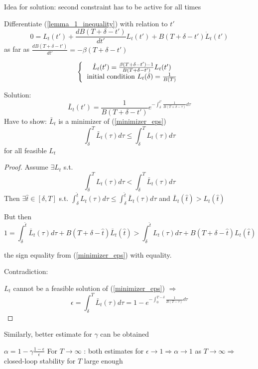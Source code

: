 Idea for solution:
second constraint has to be active for all times 

Differentiate (\ref{lemma_1_inequality}) with relation to $t'$ 
\begin{equation*}
0 = L_t(t') + \frac{dB(T+\delta-t')}{dt'}L_t(t') + B(T + \delta - t') \dot L_t(t')
\end{equation*} 
as far as $\frac{dB(T+\delta-t')}{dt'} = -\beta(T+\delta - t')$

\begin{equation*}
\left \{
  \begin{tabular}{c}
  $\dot L_t(t') = \frac{\beta(T+\delta - t') -1}{B(T+\delta - t')}L_t(t')$ \\
 initial condition $L_t(\delta)=\frac{1}{B(T)}$
  \end{tabular}
\right .
\end{equation*}

Solution:
\begin{equation*}
\bar L_t(t') = \frac{1}{B(T+\delta-t')}e^{-\int_{\delta}^{t'}\frac{1}{B (T+\delta-\tau)}d\tau}
\end{equation*}
Have to show: $\bar L_t$ is a minimizer of (\ref{minimizer_eps})
\begin{equation*}
\int_{\delta}^{T} \bar L_t(\tau)d\tau \leq \int_{\delta}^{T} L_t(\tau)d\tau 
\end{equation*}
for all feasible $L_t$

\begin{proof}

Assume $\exists L_t$ s.t. 
\begin{equation*}
\int_{\delta}^{T}L_t(\tau)d\tau < \int_{\delta}^{T}\bar L_t(\tau)d\tau
\end{equation*}
Then $\exists \hat t \in [\delta, T]$ s.t. $\int_{\delta}^{\hat t}L_t(\tau)d\tau \leq \int_{\delta}^{\hat t}\bar L_t(\tau)d\tau$ and $\bar L_t(\hat t) > L_t(\hat t)$

But then 
\begin{equation}
1 = \int_{\delta}^{\hat t} \bar L_t(\tau)d\tau + B(T+\delta-\hat t)\bar L_t(\hat t) > \int_{\delta}^{\hat t}L_t(\tau)d\tau + B(T+\delta-\hat t) L_t(\hat t)
\end{equation}

the sign equality from (\ref{minimizer_eps}) with equality.

Contradiction:

$L_t$ cannot be a feasible solution of (\ref{minimizer_eps}) 
$\Rightarrow$ 
\begin{equation*}
\epsilon = \int_{\delta}^{T}\bar L_t(\tau)d\tau = 1 - e^{-\int_0^{T-\delta}\frac{1}{B(T-\tau)}d\tau}
\end{equation*}
\end{proof}
Similarly, better estimate for $\gamma$ can be obtained

$\alpha = 1 - \gamma\frac{1-\epsilon}{\epsilon}$
For $T \to \infty$ : both estimates for $\epsilon \to 1 \Rightarrow \alpha \to 1$ as $T \to \infty \Rightarrow$ closed-loop stability for $T$ large enough 

